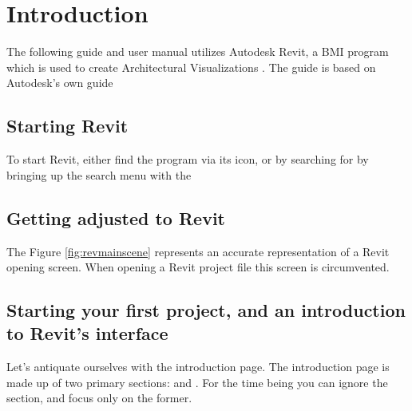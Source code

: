 \documentclass{tufte-book} %
\begin{document}
\listoffigures %






\cleardoublepage
\chapter{Introduction} %
\label{ch:0}

The following guide and user manual utilizes Autodesk Revit, a BMI program which is used to create Architectural Visualizations \cite{revit2016}. The guide is based on Autodesk's own guide \cite{guide2006}


\section{Starting Revit}


To start Revit, either find the program via its icon, or by searching for  by bringing up the search menu with the 

\section{Getting adjusted to Revit}
The Figure \ref{fig:revmainscene} represents an accurate representation of a Revit opening screen. When opening a Revit project file this screen is circumvented.

\section{Starting your first project, and an introduction to Revit's interface}
Let's antiquate ourselves with the introduction page. The introduction page is made up of two primary sections:  and . For the time being you can ignore the  section, and focus only on the former.
\end{document}
